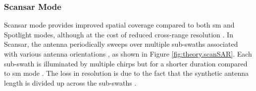 
\subsubsection{Scan\acs{sar} Mode}

Scan\acs{sar} mode provides improved spatial coverage compared to both \acs{sm} and Spotlight modes, although at the cost of reduced cross-range resolution \cite{Frery2022}. In Scan\acs{sar}, the antenna periodically sweeps over multiple sub-swaths associated with various antenna orientations \cite{Frery2022,Moreira2013}, as shown in Figure \ref{fig:theory.scanSAR}. Each sub-swath is illuminated by multiple chirps but for a shorter duration compared to \acs{sm} mode \cite{Moreira2013}. The loss in resolution is due to the fact that the synthetic antenna length is divided up across the sub-swaths \cite{Frery2022}.


